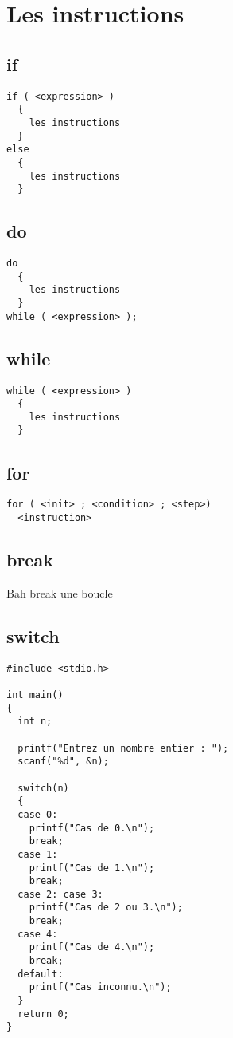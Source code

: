 \documentclass[a4paper]{article}
\begin{document}
\section{Les instructions}
\subsection{if}
\begin{lstlisting}
if ( <expression> )
  {
    les instructions
  }
else
  {
    les instructions
  }
\end{lstlisting}
\subsection{do}
\begin{lstlisting}
do
  {
    les instructions
  }
while ( <expression> );
\end{lstlisting}
\subsection{while}
\begin{lstlisting}
while ( <expression> )
  {
    les instructions
  }
\end{lstlisting}
\subsection{for}
\begin{lstlisting}
for ( <init> ; <condition> ; <step>)
  <instruction>
\end{lstlisting}
\subsection{break}
Bah break une boucle
\subsection{switch}
\begin{lstlisting}
#include <stdio.h>

int main()
{
  int n;

  printf("Entrez un nombre entier : ");
  scanf("%d", &n);

  switch(n)
  {
  case 0:
    printf("Cas de 0.\n");
    break;
  case 1:
    printf("Cas de 1.\n");
    break;
  case 2: case 3:
    printf("Cas de 2 ou 3.\n");
    break;
  case 4:
    printf("Cas de 4.\n");
    break;
  default:
    printf("Cas inconnu.\n");
  }
  return 0;
}
\end{lstlisting}
\end{document}
